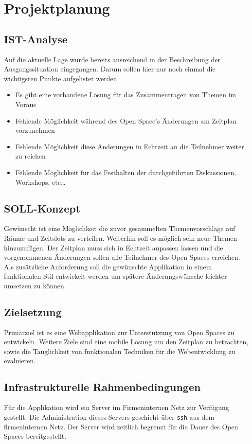 \section{Projektplanung}
\subsection{IST-Analyse}
Auf die aktuelle Lage wurde bereits ausreichend in der Beschreibung
der Ausgangssituation eingegangen. Darum sollen hier nur noch einmal
die wichtigsten Punkte aufgelistet werden.
\begin{itemize}
\item Es gibt eine vorhandene Lösung für das Zusammentragen von Themen
  im Voraus
\item Fehlende Möglichkeit während des Open Space's Änderungen am
  Zeitplan vorzunehmen
\item Fehlende Möglichkeit diese Änderungen in Echtzeit an die
  Teilnehmer weiter zu reichen
\item Fehlende Möglichkeit für das Festhalten der durchgeführten
  Diskussionen, Workshops, etc\ldots
\end{itemize}
\subsection{SOLL-Konzept}
Gewünscht ist eine Möglichkeit die zuvor gesammelten Themenvorschläge
auf Räume und Zeitslots zu verteilen. Weiterhin soll es möglich sein
neue Themen hinzuzufügen. Der Zeitplan muss sich in Echtzeit anpassen
lassen und die vorgenommenen Änderungen sollen alle Teilnehmer des
Open Spaces erreichen. Als zusätzliche Anforderung soll die gewünschte
Applikation in einem funktionalen Stil entwickelt werden um spätere
Änderungswünsche leichter umsetzen zu können.
\subsection{Zielsetzung}
Primärziel ist es eine Webapplikation zur Unterstützung von Open
Spaces zu entwickeln. Weitere Ziele sind eine mobile Lösung um den
Zeitplan zu betrachten, sowie die Tauglichkeit von funktionalen
Techniken für die Webentwicklung zu evaluieren.
\subsection{Infrastrukturelle Rahmenbedingungen}
Für die Applikation wird ein Server im Firmeninternen Netz zur
Verfügung gestellt. Die Administration dieses Servers geschieht über
\texttt{ssh} aus dem firmeninternen Netz. Der Server wird zeitlich
begrenzt für die Dauer des Open Spaces bereitgestellt.
